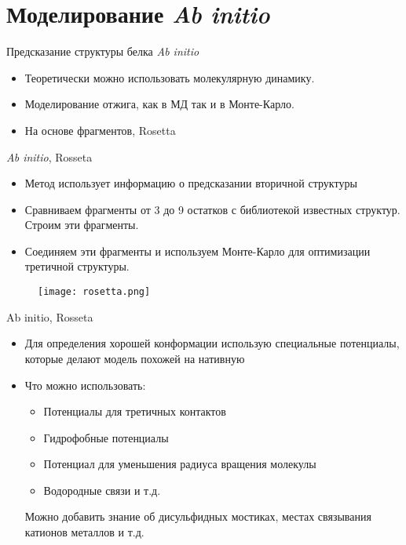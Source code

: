 \section{Моделирование \protect\textit{Ab initio}}
\begin{frame}
{Предсказание структуры белка \textit{Ab initio} }
	\begin{itemize}
		\item
			 Теоретически можно использовать молекулярную динамику.
		 \item
			 Моделирование отжига, как в МД так и в Монте-Карло. 
		 \item
			 На основе фрагментов, Rosetta
	\end{itemize}
\end{frame}
\begin{frame}
{\textit{Ab initio}, Rosseta}
	\begin{itemize}
		\item
			Метод использует информацию о предсказании вторичной структуры 
		\item 
			Сравниваем фрагменты от 3 до 9 остатков с библиотекой известных структур. Строим эти фрагменты.
		\item 
			Соединяем эти фрагменты и используем Монте-Карло для оптимизации третичной структуры. 
	\end{itemize}
			\begin{figure}
		\texttt{[image: rosetta.png]}  
			\end{figure}
\end{frame}
\begin{frame}
{Ab initio, Rosseta}	 
	\begin{itemize}
		\item
			 Для определения хорошей конформации использую специальные потенциалы, которые делают модель похожей на нативную
		 \item 
			  Что можно использовать:
			  \begin{itemize}
			  \item
			  Потенциалы для третичных  контактов
 		      \item 
			  Гидрофобные потенциалы
		      \item
			  Потенциал для уменьшения радиуса вращения молекулы
		  \item
			  Водородные связи и т.д.
	  \end{itemize}
			   Можно добавить знание об дисульфидных мостиках, местах связывания катионов металлов и т.д.
	\end{itemize}
\end{frame}

